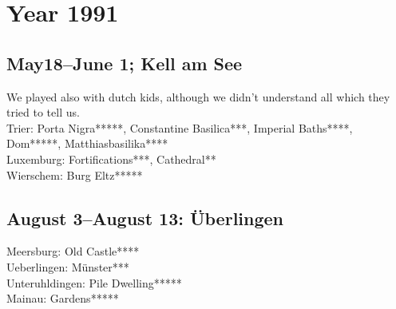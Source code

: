 \chapter{Year 1991}
\label{1991}

\section{May18--June 1; Kell am See}
\label{1991:Kell}


We played also with dutch kids, although we didn't understand all which they tried to tell us.\\

Trier: Porta Nigra*****, Constantine Basilica***, Imperial Baths****, Dom*****, Matthiasbasilika****\\
Luxemburg: Fortifications***, Cathedral**\\
Wierschem: Burg Eltz*****\\

\section{August 3--August 13: \"Uberlingen}
\label{1991:Uberlingen}


Meersburg: Old Castle****\\
Ueberlingen: M\"unster***\\
Unteruhldingen: Pile Dwelling*****\\
 Mainau: Gardens*****